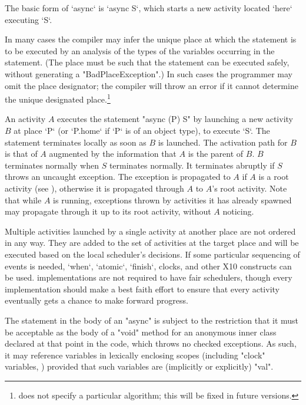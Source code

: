 The basic form of \xcd`async` is \xcd`async S`, which starts a new activity
located \xcd`here` executing \xcd`S`.   


In many cases the compiler may infer the unique place at which the
statement is to be executed by an analysis of the types of the
variables occurring in the statement. (The place must be such that the
statement can be executed safely, without generating a
\xcd"BadPlaceException".) In such cases the programmer may omit the
place designator; the compiler will throw an error if it cannot
determine the unique designated place.\footnote{\XtenCurrVer{} does
not specify a particular algorithm; this will be fixed in future
versions.}

An activity $A$ executes the statement \xcd"async (P) S" by launching
a new activity $B$ at place \xcd`P` (or \xcd`P.home` if \xcd`P` is of an
object type), to execute \xcd`S`. The statement terminates locally as soon as $B$ is
launched.  The activation path for $B$ is that of $A$ augmented by the
information that {$A$} is the parent of {$B$}. 
$B$
terminates normally when $S$ terminates normally.  It terminates
abruptly if $S$ throws an uncaught exception. The exception is
propagated to $A$ if $A$ is a root activity (see ),
otherwise it is propagated through $A$ to $A$'s root activity. Note that while
{$A$} is running, exceptions thrown by activities it has already
spawned may propagate through it up to its root activity, without {$A$} noticing.

Multiple activities launched by a single activity at another place are not
ordered in any way. They are added to the set of activities at the target
place and will be executed based on the local scheduler's decisions.
If some particular sequencing of events is needed, \xcd`when`, \xcd`atomic`,
\xcd`finish`, clocks, and other X10 constructs can be used.
\Xten{} implementations are not required to have fair schedulers,
though every implementation should make a best faith effort to ensure
that every activity eventually gets a chance to make forward progress.

\begin{staticrule*}
The statement in the body of an \xcd"async" is subject to the
restriction that it must be acceptable as the body of a \xcd"void"
method for an anonymous inner class declared at that point in the code,
which throws no checked exceptions. As such, it may reference
variables in lexically enclosing scopes (including \xcd"clock"
variables, ) provided that such variables are
(implicitly or explicitly) \xcd"val".
\end{staticrule*}

